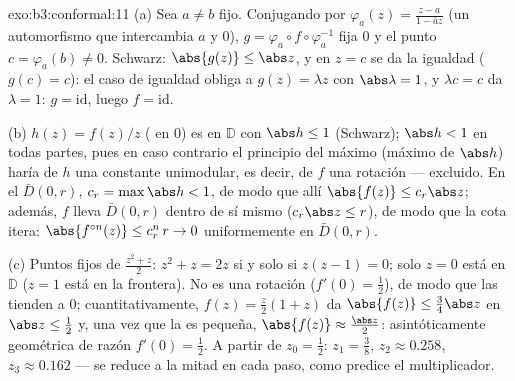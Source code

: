 \begin{solution}{exo:b3:conformal:11}
(a) Sea $a \neq b$ fijo. Conjugando por $\varphi_a(z) =
\frac{z - a}{1 - \bar az}$ (un automorfismo que intercambia $a$ y $0$),
$g = \varphi_a\circ f\circ\varphi_a^{-1}$ fija $0$ y el punto
$c = \varphi_a(b) \neq 0$. Schwarz: $\abs{g(z)} \leq \abs z$, y en
$z = c$ se da la igualdad ($g(c) = c$): el caso de igualdad obliga a
$g(z) = \lambda z$ con $\abs\lambda = 1$, y $\lambda c = c$ da
$\lambda =
1$: $g = \mathrm{id}$, luego $f = \mathrm{id}$.

(b) $h(z) = f(z)/z$ ( en $0$) es  en
$\mathbb D$ con $\abs h \leq 1$ (Schwarz); $\abs h < 1$ en todas partes,
pues en caso contrario el principio del máximo (máximo
 de $\abs h$) haría de $h$
una constante unimodular, es decir, de $f$ una rotación --- excluido. En
el  $\bar D(0,r)$,
$c_r = \max\abs h < 1$, de modo que allí $\abs{f(z)} \leq
c_r\abs z$; además, $f$ lleva $\bar D(0,r)$ dentro de sí mismo
($c_r\abs z \leq r$), de modo que la cota itera:
$\abs{f^{\circ n}(z)} \leq c_r^n\,r \to 0$ uniformemente en
$\bar D(0, r)$.

(c) Puntos fijos de $\frac{z^2 + z}2$: $z^2 + z = 2z$ si y solo si
$z(z - 1) = 0$; solo $z = 0$ está en $\mathbb D$ ($z = 1$ está en la
frontera). No es una rotación ($f'(0) = \frac12$), de modo que las
 tienden a $0$; cuantitativamente,
$f(z) = \frac z2(1 + z)$ da $\abs{f(z)} \leq \frac{3}{4}\abs z$ en
$\abs z \leq
\frac12$ y, una vez que la  es
pequeña, $\abs{f(z)} \approx
\frac{\abs z}2$: asintóticamente geométrica de razón $f'(0) = \frac12$.
A partir de $z_0 = \frac12$: $z_1 = \frac38$, $z_2 \approx 0.258$,
$z_3 \approx 0.162$ --- se reduce a la mitad en cada paso, como predice
el multiplicador.
\end{solution}

